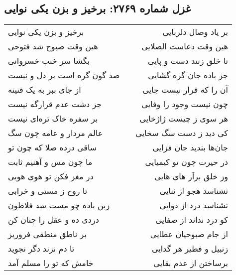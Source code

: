 \begin{center}
\section*{غزل شماره ۲۷۶۹: برخیز و بزن یکی نوایی}
\label{sec:2769}
\begin{longtable}{l p{0.5cm} r}
برخیز و بزن یکی نوایی
&&
بر یاد وصال دلربایی
\\
هین وقت صبوح شد فتوحی
&&
هین وقت دعاست الصلایی
\\
بگشا سر خنب خسروانی
&&
تا خلق زنند دست و پایی
\\
صد گون گره است بر دل و نیست
&&
جز باده جان گره گشایی
\\
از جای ببر به یک قنینه
&&
آن را که قرار نیست جایی
\\
جز دشت عدم قرارگه نیست
&&
چون نیست وجود را وفایی
\\
بر سفره خاک تره‌ای نیست
&&
هر سوی ز چیست ژاژخایی
\\
عالم مردار و عامه چون سگ
&&
کی دید ز دست سگ سخایی
\\
ساقی درده صلا که چون تو
&&
جان‌ها بندید جان فزایی
\\
ما چون مس و آهنیم ثابت
&&
در حیرت چون تو کیمیایی
\\
در مغز فکن تو هوی هویی
&&
وز خلق برآر های هایی
\\
تا روح ز مستی و خرابی
&&
نشناسد هجو از ثنایی
\\
زین باده چو مست شد فلاطون
&&
نشناسد درد از دوایی
\\
دردی ده و عقل را چنان کن
&&
کو درد نداند از صفایی
\\
بر ناطق منطقی فروریز
&&
از جام صبوحیان عطایی
\\
تا دم نزند دگر نجوید
&&
زنبیل و فطیر هر گدایی
\\
خامش که تو را مسلم آمد
&&
برساختن از عدم بقایی
\\
\end{longtable}
\end{center}
